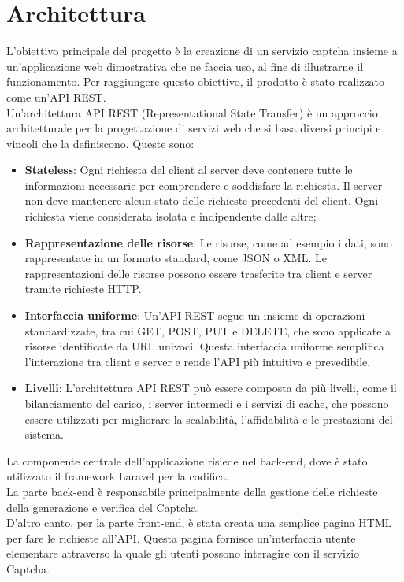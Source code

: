 \section{Architettura}
L'obiettivo principale del progetto è la creazione di un servizio captcha insieme a un'applicazione web 
dimostrativa che ne faccia uso, al fine di illustrarne il funzionamento. Per raggiungere questo obiettivo, 
il prodotto è stato realizzato come un'API REST.\\
Un'architettura API REST (Representational State Transfer) è un approccio architetturale per la progettazione di servizi web che si basa diversi principi e vincoli che la definiscono.
Queste sono:
\begin{itemize}
	\item \textbf{Stateless}: Ogni richiesta del client al server deve contenere tutte le informazioni necessarie per comprendere e soddisfare la richiesta. Il server non deve mantenere alcun stato delle richieste precedenti del client. Ogni richiesta viene considerata isolata e indipendente dalle altre;
	\item \textbf{Rappresentazione delle risorse}: Le risorse, come ad esempio i dati, sono rappresentate in un formato standard, come JSON o XML. Le rappresentazioni delle risorse possono essere trasferite tra client e server tramite richieste HTTP.
	\item \textbf{Interfaccia uniforme}:  Un'API REST segue un insieme di operazioni standardizzate, tra cui GET, POST, PUT e DELETE, che sono applicate a risorse identificate da URL univoci. Questa interfaccia uniforme semplifica l'interazione tra client e server e rende l'API più intuitiva e prevedibile.
	\item \textbf{Livelli}:  L'architettura API REST può essere composta da più livelli, come il bilanciamento del carico, i server intermedi e i servizi di cache, che possono essere utilizzati per migliorare la scalabilità, l'affidabilità e le prestazioni del sistema.\\
\end{itemize}

La componente centrale dell'applicazione risiede nel back-end, dove è stato utilizzato il framework Laravel per la codifica.\\
La parte back-end è responsabile principalmente della gestione delle richieste della generazione e verifica del Captcha. \\
D'altro canto, per la parte front-end, è stata creata una semplice pagina HTML per fare le richieste all'API. Questa pagina fornisce un'interfaccia utente elementare attraverso la quale gli utenti possono interagire con il servizio Captcha.

